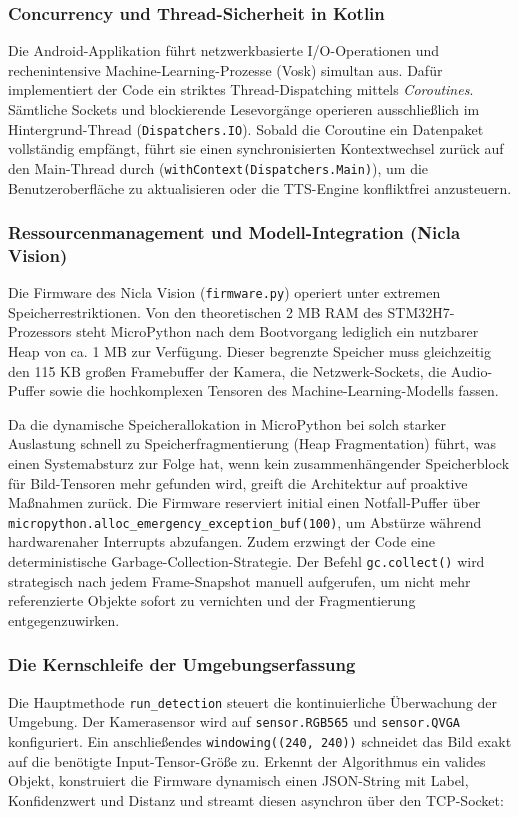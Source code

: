 \subsubsection*{Concurrency und Thread-Sicherheit in Kotlin}
Die Android-Applikation führt netzwerkbasierte I/O-Operationen und rechenintensive Machine-Learning-Prozesse (Vosk) simultan aus. Dafür implementiert der Code ein striktes Thread-Dispatching mittels \textit{Coroutines}. Sämtliche Sockets und blockierende Lesevorgänge operieren ausschließlich im Hintergrund-Thread (\texttt{Dispatchers.IO}). Sobald die Coroutine ein Datenpaket vollständig empfängt, führt sie einen synchronisierten Kontextwechsel zurück auf den Main-Thread durch (\texttt{withContext\allowbreak(Dispatchers.\allowbreak Main)}), um die Benutzeroberfläche zu aktualisieren oder die TTS-Engine konfliktfrei anzusteuern.

\subsubsection*{Ressourcenmanagement und Modell-Integration (Nicla Vision)}
Die Firmware des Nicla Vision (\texttt{firmware.py}) operiert unter extremen Speicherrestriktionen. Von den theoretischen 2 MB RAM des STM32H7-Prozessors steht MicroPython nach dem Bootvorgang lediglich ein nutzbarer Heap von ca. 1 MB zur Verfügung. Dieser begrenzte Speicher muss gleichzeitig den 115 KB großen Framebuffer der Kamera, die Netzwerk-Sockets, die Audio-Puffer sowie die hochkomplexen Tensoren des Machine-Learning-Modells fassen.

Da die dynamische Speicherallokation in MicroPython bei solch starker Auslastung schnell zu Speicherfragmentierung (Heap Fragmentation) führt, was einen Systemabsturz zur Folge hat, wenn kein zusammenhängender Speicherblock für Bild-Tensoren mehr gefunden wird, greift die Architektur auf proaktive Maßnahmen zurück. Die Firmware reserviert initial einen Notfall-Puffer über \texttt{micropython.alloc\_emergency\_exception\_buf(100)}, um Abstürze während hardwarenaher Interrupts abzufangen. Zudem erzwingt der Code eine deterministische Garbage-Collection-Strategie. Der Befehl \texttt{gc.collect()} wird strategisch nach jedem Frame-Snapshot manuell aufgerufen, um nicht mehr referenzierte Objekte sofort zu vernichten und der Fragmentierung entgegenzuwirken.

\subsubsection*{Die Kernschleife der Umgebungserfassung}
Die Hauptmethode \texttt{run\_detection} steuert die kontinuierliche Überwachung der Umgebung. Der Kamerasensor wird auf \texttt{sensor.RGB565} und \texttt{sensor.QVGA} konfiguriert. Ein anschließendes \texttt{windowing((240, 240))} schneidet das Bild exakt auf die benötigte Input-Tensor-Größe zu. Erkennt der Algorithmus ein valides Objekt, konstruiert die Firmware dynamisch einen JSON-String mit Label, Konfidenzwert und Distanz und streamt diesen asynchron über den TCP-Socket:

